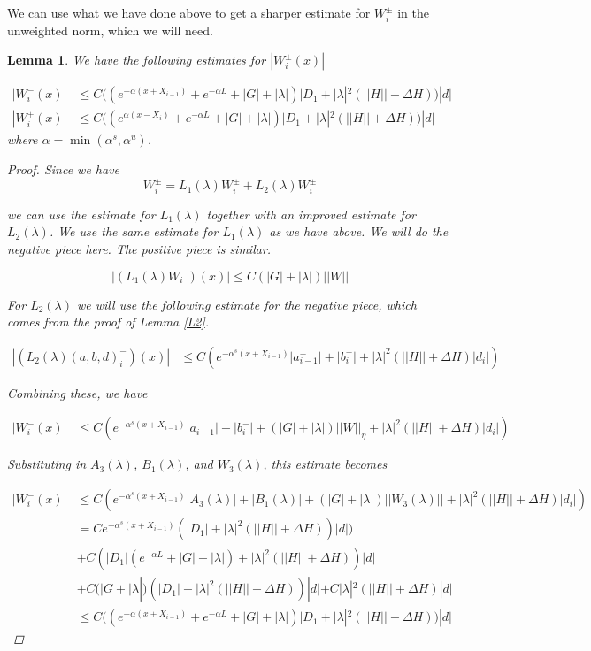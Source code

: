 \documentclass[12pt]{article}
\newtheorem{lemma}{Lemma}
\begin{document}
We can use what we have done above to get a sharper estimate for $W_i^\pm$ in the unweighted norm, which we will need.

\begin{lemma}
We have the following estimates for $|W_i^\pm(x)|$

\begin{align*}
| W_i^-(x)| &\leq C ( (e^{-\alpha(x + X_{i-1})} + e^{-\alpha L} + |G| + |\lambda|)|D_1 + |\lambda|^2 (||H|| + \Delta H))|d|\\
| W_i^+(x)| &\leq C ( (e^{\alpha(x - X_{i})} + e^{-\alpha L} + |G| + |\lambda|)|D_1 + |\lambda|^2 (||H|| + \Delta H))|d|
\end{align*}
where $\alpha = \min(\alpha^s, \alpha^u)$.

\begin{proof}
Since we have 
\[
W_i^\pm = L_1(\lambda)W_i^\pm + L_2(\lambda)W_i^\pm 
\]

we can use the estimate for $L_1(\lambda)$ together with an improved estimate for $L_2(\lambda)$. We use the same estimate for $L_1(\lambda)$ as we have above. We will do the negative piece here. The positive piece is similar.

\[
| (L_1(\lambda) W_i^-)(x) | \leq C\left(|G| +|\lambda|\right)||W||
\]

For $L_2(\lambda)$ we will use the following estimate for the negative piece, which comes from the proof of Lemma \ref{L2}.

\begin{align*}
| (L_2(\lambda)(a, b, d)_i^-)(x)| &\leq C \left( e^{-\alpha^s(x + X_{i-1})} |a^-_{i-1}| + |b_i^-| + |\lambda|^2 (||H|| + \Delta H)|d_i| \right)
\end{align*}

Combining these, we have

\begin{align*}
| W_i^-(x)| &\leq C \left( e^{-\alpha^s(x + X_{i-1})} |a^-_{i-1}| + |b_i^-| + \left(|G| +|\lambda|\right)||W||_\eta + |\lambda|^2 (||H|| + \Delta H)|d_i|  \right)
\end{align*}

Substituting in $A_3(\lambda)$, $B_1(\lambda)$, and $W_3(\lambda)$, this estimate becomes

\begin{align*}
| W_i^-(x)| &\leq C \left( e^{-\alpha^s(x + X_{i-1})} |A_3(\lambda)| + |B_1(\lambda)| + \left(|G| +|\lambda|\right)||W_3(\lambda)|| + |\lambda|^2 (||H|| + \Delta H)|d_i|  \right) \\
&= C e^{-\alpha^s(x + X_{i-1})} (|D_1| + |\lambda|^2(||H|| + \Delta H ))|d|)\\
&+ C (|D_1|(e^{-\alpha L} + |G| + |\lambda|) + |\lambda|^2(||H|| + \Delta H ))|d|\\
&+ C (|G +|\lambda|)(|D_1| + |\lambda|^2(||H|| + \Delta H ))|d| + C |\lambda|^2 (||H|| + \Delta H)|d| \\
&\leq C ( (e^{-\alpha(x + X_{i-1})} + e^{-\alpha L} + |G| + |\lambda|)|D_1 + |\lambda|^2 (||H|| + \Delta H))|d|
\end{align*}


\end{proof}
\end{lemma}
\end{document}
